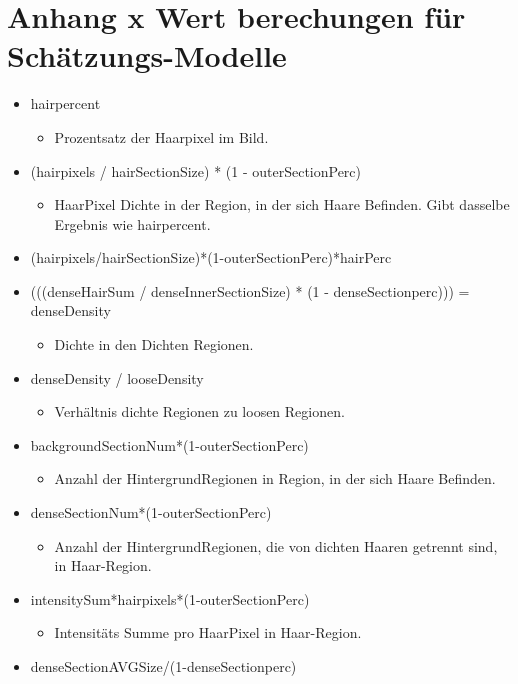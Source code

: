 \documentclass[german,a4paper, 12pt]{scrartcl}
\begin{document}
\section{Anhang x Wert berechungen für Schätzungs-Modelle}
\label{appendix:xwertemodel}
\begin{itemize}
	\item hairpercent 
	\begin{itemize}
		\item Prozentsatz der Haarpixel im Bild.
	\end{itemize}
	\item (hairpixels / hairSectionSize) * (1 - outerSectionPerc)
	\begin{itemize}
		\item HaarPixel Dichte in der Region, in der sich Haare Befinden. Gibt dasselbe Ergebnis wie hairpercent.
	\end{itemize}
	\item (hairpixels/hairSectionSize)*(1-outerSectionPerc)*hairPerc
	\item (((denseHairSum / denseInnerSectionSize) * (1 - denseSectionperc))) = denseDensity
	\begin{itemize}
		\item Dichte in den Dichten Regionen.
	\end{itemize}
	\item denseDensity / looseDensity
	\begin{itemize}
		\item Verhältnis dichte Regionen zu loosen Regionen.
	\end{itemize}
	\item backgroundSectionNum*(1-outerSectionPerc)
		\begin{itemize}
		\item Anzahl der HintergrundRegionen in Region, in der sich Haare Befinden.
	\end{itemize}
	\item denseSectionNum*(1-outerSectionPerc)
		\begin{itemize}
		\item Anzahl der HintergrundRegionen, die von dichten Haaren getrennt sind, in Haar-Region.
	\end{itemize}
	\item intensitySum*hairpixels*(1-outerSectionPerc)
	\begin{itemize}
		\item Intensitäts Summe pro HaarPixel in Haar-Region.
	\end{itemize}
	\item denseSectionAVGSize/(1-denseSectionperc)

\end{itemize}
\end{document}
